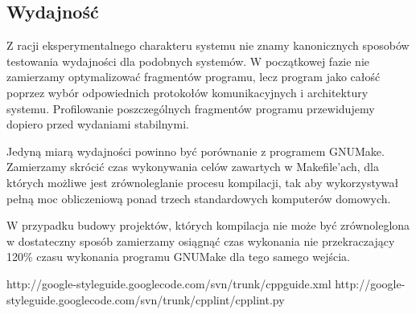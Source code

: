 \documentclass[a4paper]{article}
\begin{document}
\subsection{Wydajność}

Z racji eksperymentalnego charakteru systemu nie znamy kanonicznych sposobów testowania wydajności dla podobnych systemów. W początkowej fazie nie zamierzamy optymalizować fragmentów programu, lecz program jako całość poprzez wybór odpowiednich protokołów komunikacyjnych i architektury systemu.
Profilowanie poszczególnych fragmentów programu przewidujemy dopiero przed wydaniami stabilnymi.

Jedyną miarą wydajności powinno być porównanie z programem GNUMake. Zamierzamy skrócić czas wykonywania celów zawartych w Makefile’ach, dla których możliwe jest zrównoleglanie procesu kompilacji, tak aby wykorzystywał pełną moc obliczeniową ponad trzech standardowych komputerów domowych.

W przypadku budowy projektów, których kompilacja nie może być zrównoleglona w dostateczny sposób zamierzamy osiągnąć czas wykonania nie przekraczający 120\% czasu wykonania programu GNUMake dla tego samego wejścia.

\begin{thebibliography}{9}
 http://google-styleguide.googlecode.com/svn/trunk/cppguide.xml
 http://google-styleguide.googlecode.com/svn/trunk/cpplint/cpplint.py
\end{thebibliography}
\end{document}
